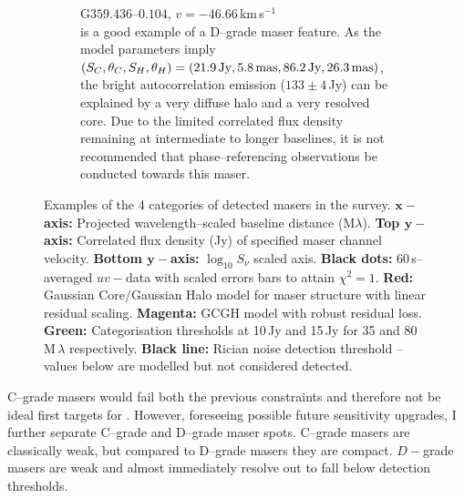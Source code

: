 {\begin{figure}[h]
\begin{subfigure}[t]{0.45\linewidth}
	    			\caption[]{\footnotesize G$359.436$--$0.104$, $v=-46.66$\,km\,s$^{-1}$\\ is a good example of a D--grade maser feature. As the model parameters imply $(S_C,\theta_C, S_H,\theta_H) = (21.9\text{\,Jy},5.8\text{\,mas},86.2\text{\,Jy},26.3\text{\,mas})$, the bright autocorrelation emission ($133\pm4$\,Jy) can be explained by a very diffuse halo and a very resolved core. Due to the limited correlated flux density remaining at intermediate to longer baselines, it is not recommended that phase--referencing observations be conducted towards this maser.}    
	    		\end{subfigure}
	    		\caption[]{Examples of the 4 categories of detected masers in the survey. {\bf $\boldsymbol{x-}$axis:} Projected wavelength--scaled baseline distance (M$\lambda$). {\bf Top $\boldsymbol{y-}$axis:} Correlated flux density (Jy) of specified maser channel velocity. {\bf Bottom $\boldsymbol{y-}$axis:} $\log_{10}S_\nu$ scaled axis. {\bf Black dots:} 60\,s--averaged $uv-$data with scaled errors bars to attain $\chi^2=1$. {\bf Red:} Gaussian Core/Gaussian Halo model for maser structure with linear residual scaling.  {\bf Magenta:} GCGH model with robust residual loss. {\bf Green:} Categorisation thresholds at 10\,Jy and 15\,Jy for 35 and 80\,M\,$\lambda$ respectively. {\bf Black line:} Rician noise detection threshold -- values below are modelled but not considered detected.}
	    		\label{fig:grade_examples}
	    	\end{figure}
	    	\clearpage
	    }
	    
        C--grade masers would fail both the previous constraints and therefore not be ideal first targets for \spirals. However, foreseeing possible future sensitivity upgrades, I further separate C--grade and D--grade maser spots. C--grade masers are classically weak, but compared to D--grade masers they are compact. $D-$grade masers are weak and almost immediately resolve out to fall below detection thresholds.
        
